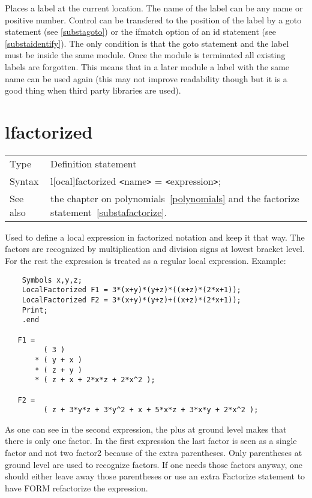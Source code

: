 \noindent Places a label at the current location. The name of 
the label can be any name or positive number. Control can be transfered to the 
position of the label by a goto statement (see 
\ref{substagoto}) or the ifmatch option of an id statement 
(see \ref{substaidentify}). The only condition is that the goto statement 
and the label must be inside the same module. Once the module is terminated 
all existing labels are forgotten. This means that in a later module a 
label with the same name can be used again (this may not improve 
readability though but it is a good thing when third party libraries are 
used). \vspace{10mm}


\section{lfactorized}
\label{substalfactorized}

\noindent \begin{tabular}{ll}
Type & Definition statement\\
Syntax & l[ocal]factorized {\tt<}name{\tt>} = {\tt<}expression{\tt>};
\\ See also & the chapter on polynomials~\ref{polynomials} and the 
factorize statement~\ref{substafactorize}.
\end{tabular} \vspace{4mm}

\noindent Used to define a local expression in factorized 
notation and keep it that way. The factors are recognized by multiplication 
and division signs at lowest bracket level. For the rest the expression is 
treated as a regular local expression. Example:
\begin{verbatim}
    Symbols x,y,z;
    LocalFactorized F1 = 3*(x+y)*(y+z)*((x+z)*(2*x+1));
    LocalFactorized F2 = 3*(x+y)*(y+z)+((x+z)*(2*x+1));
    Print;
    .end

   F1 =
         ( 3 )
       * ( y + x )
       * ( z + y )
       * ( z + x + 2*x*z + 2*x^2 );

   F2 =
         ( z + 3*y*z + 3*y^2 + x + 5*x*z + 3*x*y + 2*x^2 );
\end{verbatim}
\noindent As one can see in the second expression, the plus at ground level 
makes that there is only one factor. In the first expression the last 
factor is seen as a single factor and not two factor2 because of the extra 
parentheses. Only parentheses at ground level are used to recognize 
factors. If one needs those factors anyway, one should either leave away 
those parentheses or use an extra Factorize statement to have FORM 
refactorize the expression.
\vspace{10mm}

